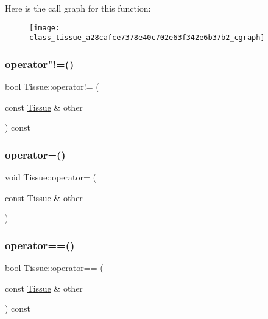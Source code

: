 Here is the call graph for this function\+:
\nopagebreak
\begin{figure}[H]
\begin{center}
\leavevmode
\texttt{[image: class\_tissue\_a28cafce7378e40c702e63f342e6b37b2\_cgraph]}
\end{center}
\end{figure}
\mbox{\label{class_tissue_aa0ca0885c74788d123d7b5406f695fe5}} 
\subsubsection{\texorpdfstring{operator"!=()}{operator!=()}}
{\footnotesize\ttfamily bool Tissue\+::operator!= (\begin{DoxyParamCaption}\item[{const \mbox{\hyperlink{class_tissue}{Tissue}} \&}]{other }\end{DoxyParamCaption}) const}

\mbox{\label{class_tissue_a5982c346b12cd55c6dbe5114eea8d3f3}} 
\subsubsection{\texorpdfstring{operator=()}{operator=()}}
{\footnotesize\ttfamily void Tissue\+::operator= (\begin{DoxyParamCaption}\item[{const \mbox{\hyperlink{class_tissue}{Tissue}} \&}]{other }\end{DoxyParamCaption})}

\mbox{\label{class_tissue_a7c22bbf06c50006c5e21b7066da55f38}} 
\subsubsection{\texorpdfstring{operator==()}{operator==()}}
{\footnotesize\ttfamily bool Tissue\+::operator== (\begin{DoxyParamCaption}\item[{const \mbox{\hyperlink{class_tissue}{Tissue}} \&}]{other }\end{DoxyParamCaption}) const}

